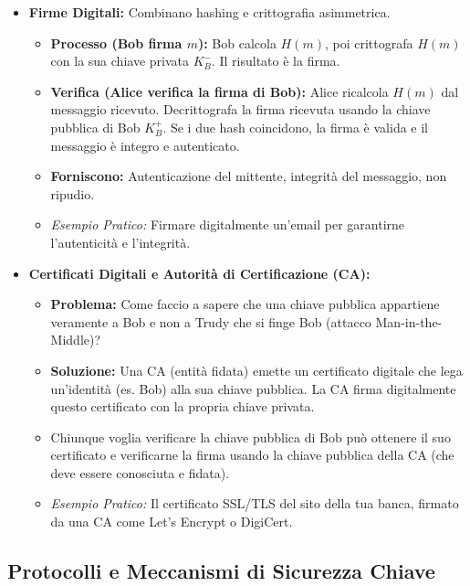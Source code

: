 \begin{itemize}
    \item \textbf{Firme Digitali:} Combinano hashing e crittografia asimmetrica.
    \begin{itemize}
        \item \textbf{Processo (Bob firma $m$):} Bob calcola $H(m)$, poi crittografa $H(m)$ con la sua chiave privata $K_B^-$. Il risultato è la firma.
        \item \textbf{Verifica (Alice verifica la firma di Bob):} Alice ricalcola $H(m)$ dal messaggio ricevuto. Decrittografa la firma ricevuta usando la chiave pubblica di Bob $K_B^+$. Se i due hash coincidono, la firma è valida e il messaggio è integro e autenticato.
        \item \textbf{Forniscono:} Autenticazione del mittente, integrità del messaggio, non ripudio.
        \item \emph{Esempio Pratico:} Firmare digitalmente un'email per garantirne l'autenticità e l'integrità.
    \end{itemize}

    \item \textbf{Certificati Digitali e Autorità di Certificazione (CA):}
    \begin{itemize}
        \item \textbf{Problema:} Come faccio a sapere che una chiave pubblica appartiene veramente a Bob e non a Trudy che si finge Bob (attacco Man-in-the-Middle)?
        \item \textbf{Soluzione:} Una CA (entità fidata) emette un certificato digitale che lega un'identità (es. Bob) alla sua chiave pubblica. La CA firma digitalmente questo certificato con la propria chiave privata.
        \item Chiunque voglia verificare la chiave pubblica di Bob può ottenere il suo certificato e verificarne la firma usando la chiave pubblica della CA (che deve essere conosciuta e fidata).
        \item \emph{Esempio Pratico:} Il certificato SSL/TLS del sito della tua banca, firmato da una CA come Let's Encrypt o DigiCert.
    \end{itemize}
\end{itemize}

\subsection{Protocolli e Meccanismi di Sicurezza Chiave}

